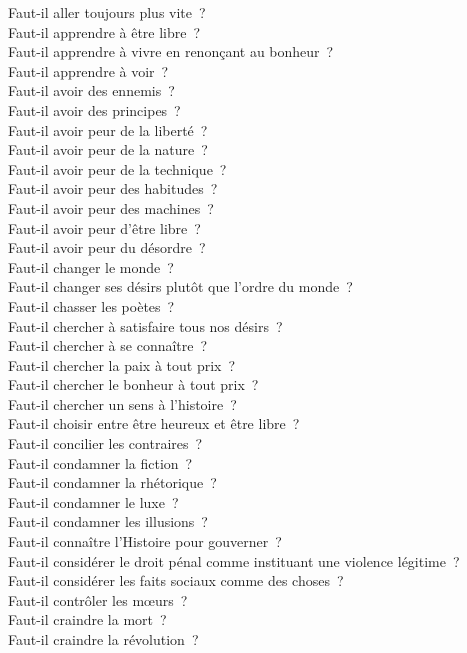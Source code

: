 \documentclass[a4paper,12pt]{article}
\begin{document}
Faut-il aller toujours plus vite ? \\
Faut-il apprendre à être libre ? \\
Faut-il apprendre à vivre en renonçant au bonheur ? \\
Faut-il apprendre à voir ? \\
Faut-il avoir des ennemis ? \\
Faut-il avoir des principes ? \\
Faut-il avoir peur de la liberté ? \\
Faut-il avoir peur de la nature ? \\
Faut-il avoir peur de la technique ? \\
Faut-il avoir peur des habitudes ? \\
Faut-il avoir peur des machines ? \\
Faut-il avoir peur d'être libre ? \\
Faut-il avoir peur du désordre ? \\
Faut-il changer le monde ? \\
Faut-il changer ses désirs plutôt que l'ordre du monde ? \\
Faut-il chasser les poètes ? \\
Faut-il chercher à satisfaire tous nos désirs ? \\
Faut-il chercher à se connaître ? \\
Faut-il chercher la paix à tout prix ? \\
Faut-il chercher le bonheur à tout prix ? \\
Faut-il chercher un sens à l'histoire ? \\
Faut-il choisir entre être heureux et être libre ? \\
Faut-il concilier les contraires ? \\
Faut-il condamner la fiction ? \\
Faut-il condamner la rhétorique ? \\
Faut-il condamner le luxe ? \\
Faut-il condamner les illusions ? \\
Faut-il connaître l'Histoire pour gouverner ? \\
Faut-il considérer le droit pénal comme instituant une violence légitime ? \\
Faut-il considérer les faits sociaux comme des choses ? \\
Faut-il contrôler les mœurs ? \\
Faut-il craindre la mort ? \\
Faut-il craindre la révolution ? \\
\end{document}
